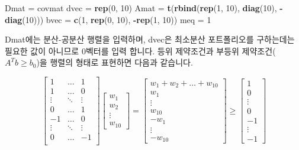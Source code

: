 \documentclass[12pt,]{book}
\newenvironment{Shaded}{\begin{snugshade}}{\end{snugshade}}
\newcommand{\DecValTok}[1]{\textcolor[rgb]{0.00,0.00,0.81}{#1}}
\newcommand{\KeywordTok}[1]{\textcolor[rgb]{0.13,0.29,0.53}{\textbf{#1}}}
\newcommand{\NormalTok}[1]{#1}
\newcommand{\OperatorTok}[1]{\textcolor[rgb]{0.81,0.36,0.00}{\textbf{#1}}}
\newcommand{\StringTok}[1]{\textcolor[rgb]{0.31,0.60,0.02}{#1}}
\begin{document}
\begin{Shaded}
\begin{Highlighting}[]
\NormalTok{Dmat =}\StringTok{ }\NormalTok{covmat}
\NormalTok{dvec =}\StringTok{ }\KeywordTok{rep}\NormalTok{(}\DecValTok{0}\NormalTok{, }\DecValTok{10}\NormalTok{)}
\NormalTok{Amat =}\StringTok{ }\KeywordTok{t}\NormalTok{(}\KeywordTok{rbind}\NormalTok{(}\KeywordTok{rep}\NormalTok{(}\DecValTok{1}\NormalTok{, }\DecValTok{10}\NormalTok{), }\KeywordTok{diag}\NormalTok{(}\DecValTok{10}\NormalTok{), }\OperatorTok{-}\KeywordTok{diag}\NormalTok{(}\DecValTok{10}\NormalTok{)))}
\NormalTok{bvec =}\StringTok{ }\KeywordTok{c}\NormalTok{(}\DecValTok{1}\NormalTok{, }\KeywordTok{rep}\NormalTok{(}\DecValTok{0}\NormalTok{, }\DecValTok{10}\NormalTok{), }\OperatorTok{-}\KeywordTok{rep}\NormalTok{(}\DecValTok{1}\NormalTok{, }\DecValTok{10}\NormalTok{))}
\NormalTok{meq =}\StringTok{ }\DecValTok{1}
\end{Highlighting}
\end{Shaded}

Dmat에는 분산-공분산 행렬을 입력하며, dvec은 최소분산 포트폴리오를 구하는데는 필요한 값이 아니므로 0벡터를 입력 합니다. 등위 제약조건과 부등위 제약조건(\(A^Tb \ge b_0\))을 행렬의 형태로 표현하면 다음과 같습니다.

\[ \begin{bmatrix}
1 &  \dots & 1 \\ 1 &  \dots & 0 \\ \vdots &  \ddots & \vdots \\
0 &  \dots & 1 \\ -1 & \dots & 0 \\ \vdots &  \ddots & \vdots \\
0 &  \dots & -1 \\ \end{bmatrix}
\begin{bmatrix} w_1 \\ w_2 \\ \vdots \\ w_{10} \end{bmatrix} = 
\begin{bmatrix} w_1 + w_2 + \dots + w_{10} \\ w_1 \\ \vdots \\ w_{10} \\ -w_1 \\ 
\vdots \\ -w_{10}
\end{bmatrix} \ge \begin{bmatrix} 1 \\ 0 \\ \vdots \\ 0 \\ -1 \\ \vdots \\ -1 \end{bmatrix} \]
\end{document}
